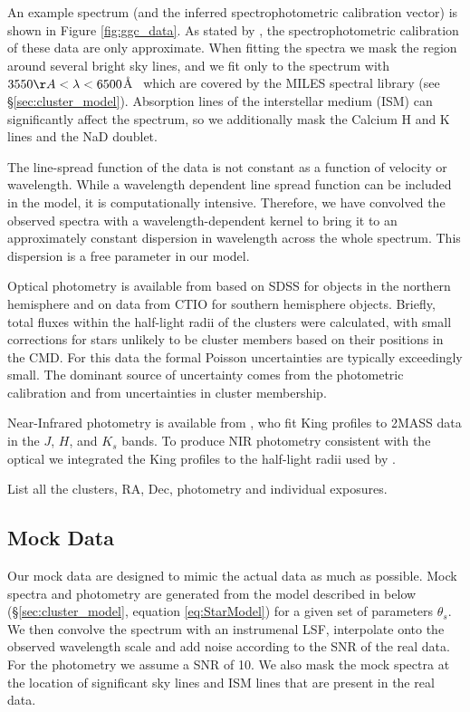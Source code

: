 \documentclass[iop,numberedappendix]{emulateapj}
\begin{document}
An example spectrum (and the inferred spectrophotometric calibration
vector) is shown in Figure \ref{fig:ggc_data}.  As stated by
\citet{schiavon05}, the spectrophotometric calibration of these data
are only approximate.  When fitting the spectra we mask the region
around  several bright sky lines, and we fit only to the spectrum
with $3550\AA < \lambda < 6500$\AA~ which are covered by the MILES
spectral library (see \S\ref{sec:cluster_model}).  Absorption lines of
the interstellar medium (ISM) can significantly affect the spectrum,
so we additionally mask the Calcium H and K lines and the NaD doublet.

The line-spread function of the data is not constant as a function of
velocity or wavelength.  While a wavelength dependent line spread
function can be included in the model, it is computationally
intensive. Therefore, we have convolved the observed spectra with a
wavelength-dependent kernel to bring it to an approximately constant
dispersion in wavelength across the whole spectrum. This dispersion is
a free parameter in our model.

Optical photometry is available from \citep{vanderbeke14} based on
SDSS for objects in the northern hemisphere and on data from CTIO for
southern hemisphere objects.  Briefly, total fluxes within the half-light radii
of the clusters \citet{harris98} were calculated, with small
corrections for stars unlikely to be cluster members based on their
positions in the CMD. For this data the formal Poisson uncertainties
are typically exceedingly small.  The dominant source of uncertainty
comes from the photometric calibration and from uncertainties in
cluster membership.

Near-Infrared photometry is available from \citet{cohen07}, who fit
King profiles \citet{king65} to 2MASS data in the $J$, $H$, and $K_s$
bands.  To produce NIR photometry consistent with the optical we
integrated the King profiles to the half-light radii used by
\citet{vanderbeke14}.

\begin{table}[h!]
\caption{List all the clusters, RA, Dec, photometry and individual exposures.}
\end{table}


\subsection{Mock Data}
Our mock data are designed to mimic the actual data as much as
possible.  Mock spectra and photometry are generated from the model
described in below (\S\ref{sec:cluster_model}, equation
\ref{eq:StarModel}) for a given set of parameters $\theta_s$.  We then
convolve the spectrum with an instrumenal LSF, interpolate onto the
observed wavelength scale and add noise according to the SNR of the
real data.  For the photometry we assume a SNR of 10.  We also mask
the mock spectra at the location of significant sky lines and ISM
lines that are present in the real data.
\end{document}
